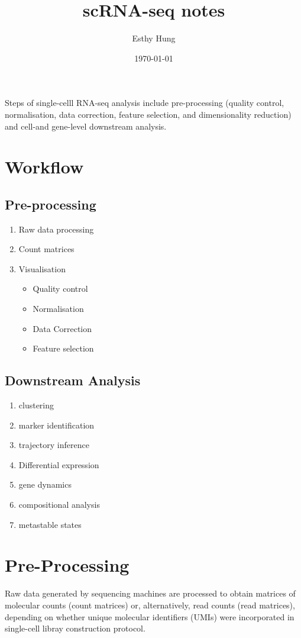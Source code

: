 \documentclass[a4paper,12pt]{article}
\title{scRNA-seq notes}
\author{Esthy Hung}
\date{\today}
\begin{document}
\maketitle

Steps of single-celll RNA-seq analysis include pre-processing (quality control, normalisation, data correction, feature selection, and dimensionality reduction) and cell-and gene-level downstream analysis.
\section{Workflow}
\subsection{Pre-processing}
\begin{enumerate}
\item Raw data processing
\item Count matrices
\item Visualisation
\begin{itemize}
\item Quality control
\item Normalisation
\item Data Correction
\item Feature selection
\end{itemize}
\end{enumerate}

\subsection{Downstream Analysis}
\begin{enumerate}
\item clustering
\item marker identification
\item trajectory inference
\item Differential expression
\item gene dynamics
\item compositional analysis
\item metastable states
\end{enumerate}

\section{Pre-Processing}
Raw data generated by sequencing machines are processed to obtain matrices of molecular counts (count matrices) or, alternatively, read counts (read matrices), depending on whether unique molecular identifiers (UMIs) were incorporated in single-cell libray construction protocol.
\end{document}
